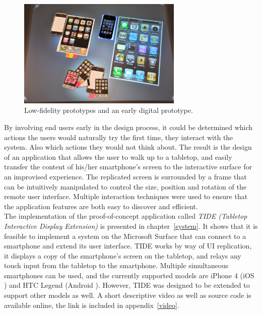 \begin{figure}[htb]
  \centering
    \includegraphics[width=0.7\textwidth]{images/paperprot2}
  \caption{Low-fidelity prototypes and an early digital prototype.}
  \label{fig:vortex}
\end{figure}

By involving end users early in the design process, it could be determined which actions the users would naturally try the first time, they interact with the system.
Also which actions they would not think about.
The result is the design of an application that allows the user to walk up to a tabletop, and easily transfer the content of his/her smartphone's screen to the interactive surface for an improvised experience.
The replicated screen is surrounded by a frame that can be intuitively manipulated to control the size, position and rotation of the remote user interface.
Multiple interaction techniques were used to ensure that the application features are both easy to discover and efficient.
\\
\linebreak
The implementation of the proof-of-concept application called \emph{TIDE (Tabletop Interactive Display Extension)} is presented in chapter~\ref{system}.
It shows that it is feasible to implement a system on the Microsoft Surface \citep{ms} that can connect to a smartphone and extend its user interface.
TIDE works by way of UI replication, it displays a copy of the smartphone's screen on the tabletop, and relays any touch input from the tabletop to the smartphone.
Multiple simultaneous smartphones can be used, and the currently supported models are iPhone 4 (iOS \citep{ios}) and HTC Legend (Android \citep{android}).
However, TIDE was designed to be extended to support other models as well.
A short descriptive video as well as source code is available online, the link is included in appendix~\ref{video}.


